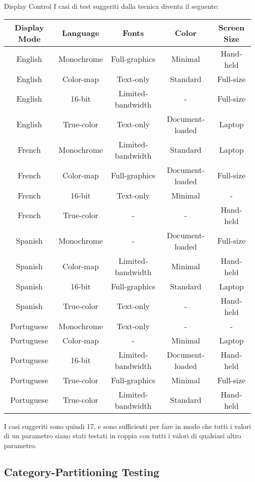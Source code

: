 \begin{example}{}{Display Control}
    I casi di test suggeriti dalla tecnica diventa il seguente: \\

    \begin{tabular}{c | c | c | c | c}
        Display Mode & Language & Fonts & Color & Screen Size \\ \hline
        English & Monochrome & Full-graphics & Minimal & Hand-held \\
        English & Color-map & Text-only & Standard & Full-size \\
        English & 16-bit & Limited-bandwidth & - & Full-size \\
        English & True-color & Text-only & Document-loaded & Laptop \\
        French & Monochrome & Limited-bandwidth & Standard & Laptop \\
        French & Color-map & Full-graphics & Document-loaded & Full-size \\
        French & 16-bit & Text-only & Minimal & - \\
        French & True-color & - & - & Hand-held \\
        Spanish & Monochrome & - & Document-loaded & Full-size \\
        Spanish & Color-map & Limited-bandwidth & Minimal & Hand-held \\
        Spanish & 16-bit & Full-graphics & Standard & Laptop \\
        Spanish & True-color & Text-only & - & Hand-held \\
        Portuguese & Monochrome & Text-only & - & - \\
        Portuguese & Color-map & - & Minimal & Laptop \\
        Portuguese & 16-bit & Limited-bandwidth & Document-loaded & Hand-held \\
        Portuguese & True-color & Full-graphics & Minimal & Full-size \\
        Portuguese & True-color & Limited-bandwidth & Standard & Hand-held
    \end{tabular}

    I casi suggeriti sono quindi 17, e sono sufficienti per fare in modo che tutti i valori di un parametro siano stati testati in coppia con tutti i valori di qualsiasi altro parametro.
\end{example}

\subsection{Category-Partitioning Testing}

